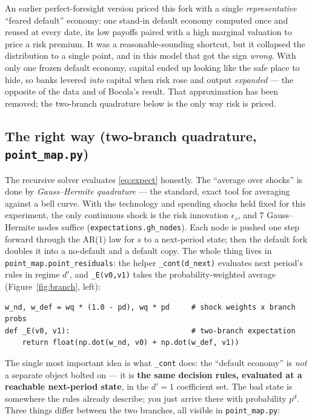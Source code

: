\documentclass[11pt]{article}
\newcommand{\code}[1]{\texttt{#1}}
\begin{document}
An earlier perfect-foresight version priced this fork with a single
\emph{representative} ``feared default'' economy: one stand-in default economy
computed once and reused at every date, its low payoffs paired with a high
marginal valuation to price a risk premium. It was a reasonable-sounding
shortcut, but it collapsed the distribution to a single point, and in this
model that got the sign \emph{wrong}. With only one frozen default economy,
capital ended up looking like the safe place to hide, so banks levered
\emph{into} capital when risk rose and output \emph{expanded} --- the opposite
of the data and of Bocola's result. That approximation has been removed; the
two-branch quadrature below is the only way risk is priced.

\subsection{The right way (two-branch quadrature, \code{point\_map.py})}

The recursive solver evaluates \eqref{eq:expect} honestly. The ``average over
shocks'' is done by \emph{Gauss--Hermite quadrature} --- the standard, exact
tool for averaging against a bell curve. With the technology and spending
shocks held fixed for this experiment, the only continuous shock is the risk
innovation $\epsilon_s$, and $7$ Gauss--Hermite nodes suffice
(\code{expectations.gh\_nodes}). Each node is pushed one step forward through
the AR(1) law for $s$ to a next-period state; then the default fork doubles
it into a no-default and a default copy. The whole thing lives in
\code{point\_map.point\_residuals}: the helper \code{\_cont(d\_next)}
evaluates next period's rules in regime $d'$, and \code{\_E(v0,v1)} takes the
probability-weighted average (Figure~\ref{fig:branch}, left):
\begin{verbatim}
w_nd, w_def = wq * (1.0 - pd), wq * pd     # shock weights x branch probs
def _E(v0, v1):                            # two-branch expectation
    return float(np.dot(w_nd, v0) + np.dot(w_def, v1))
\end{verbatim}
The single most important idea is what \code{\_cont} does: the ``default
economy'' is \emph{not} a separate object bolted on --- it is \textbf{the same
decision rules, evaluated at a reachable next-period state}, in the $d'=1$
coefficient set. The bad state is somewhere the rules already describe; you
just arrive there with probability $p^d$. Three things differ between the two
branches, all visible in \code{point\_map.py}:
\end{document}
